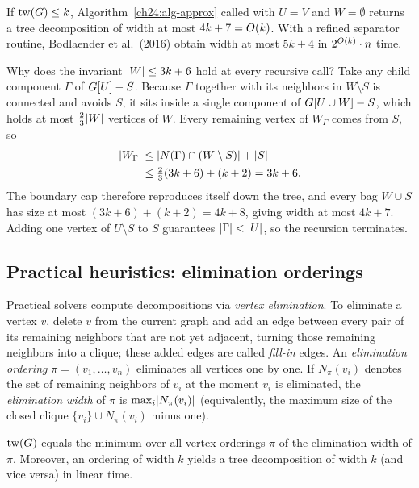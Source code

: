 \begin{theorem}
\label{ch24:thm-approx}
If $\operatorname{tw}(G)\le k$, Algorithm~\ref{ch24:alg-approx} called with $U=V$ and
$W=\emptyset$ returns a tree decomposition of width at most $4k+7=O(k)$. With a
refined separator routine, Bodlaender et al.\ (2016) obtain width at most $5k+4$
in $2^{O(k)}\cdot n$ time.
\end{theorem}

\begin{whybox}
Why does the invariant $\lvert W\rvert\le 3k+6$ hold at every recursive call? Take any
child component $\Gamma$ of $G[U]-S$. Because $\Gamma$ together with
its neighbors in $W\setminus S$ is connected and avoids $S$, it sits inside a
single component of $G[U\cup W]-S$, which holds at most
$\tfrac23\lvert W\rvert$ vertices of $W$. Every remaining vertex of $W_\Gamma$ comes from
$S$, so
\begin{align*}
  \lvert W_\Gamma\rvert
  &\le \lvert N(\Gamma)\cap (W\setminus S)\rvert + \lvert S\rvert \\
  &\le \tfrac23(3k+6) + (k+2) = 3k+6.
\end{align*}
The boundary cap therefore reproduces itself down the tree, and every bag $W\cup S$
has size at most $(3k+6)+(k+2)=4k+8$, giving width at most $4k+7$. Adding one
vertex of $U\setminus S$ to $S$ guarantees $\lvert\Gamma\rvert<\lvert U\rvert$, so the recursion
terminates.
\end{whybox}

\subsection{Practical heuristics: elimination orderings}

Practical solvers compute decompositions via \emph{vertex elimination}. To
eliminate a vertex $v$, delete $v$ from the current graph and add an edge between
every pair of its remaining neighbors that are not yet adjacent, turning those
remaining neighbors into a clique; these added edges are called \emph{fill-in}
edges. An \emph{elimination ordering} $\pi=(v_1,\dots,v_n)$ eliminates all vertices
one by one. If $N_\pi(v_i)$ denotes the set of remaining neighbors of $v_i$ at the
moment $v_i$ is eliminated, the \emph{elimination width} of $\pi$ is
$\max_i \lvert N_\pi(v_i)\rvert$ (equivalently, the maximum size of the closed clique
$\{v_i\}\cup N_\pi(v_i)$ minus one).

\begin{theorem}
\label{ch24:thm-elim}
$\operatorname{tw}(G)$ equals the minimum over all vertex orderings $\pi$ of the elimination
width of $\pi$. Moreover, an ordering of width $k$ yields a tree decomposition of
width $k$ (and vice versa) in linear time.
\end{theorem}

